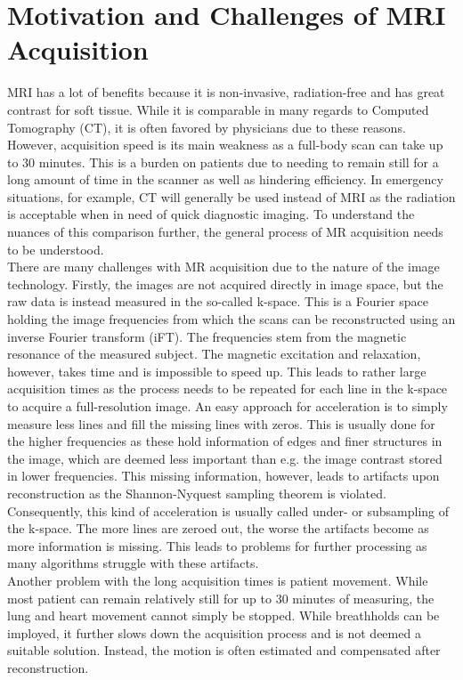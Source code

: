 \section{Motivation and Challenges of MRI Acquisition} \label{Sec:MotivationChallengesMRIAcquisition}
MRI has a lot of benefits because it is non-invasive, radiation-free and has great contrast for soft tissue. While it is comparable in many regards to Computed Tomography (CT), it is often favored by physicians due to these reasons. However, acquisition speed is its main weakness as a full-body scan can take up to 30 minutes. This is a burden on patients due to needing to remain still for a long amount of time in the scanner as well as hindering efficiency. In emergency situations, for example, CT will generally be used instead of MRI as the radiation is acceptable when in need of quick diagnostic imaging. To understand the nuances of this comparison further, the general process of MR acquisition needs to be understood.\\
There are many challenges with MR acquisition due to the nature of the image technology. Firstly, the images are not acquired directly in image space, but the raw data is instead measured in the so-called k-space. This is a Fourier space holding the image frequencies from which the scans can be reconstructed using an inverse Fourier transform (iFT). The frequencies stem from the magnetic resonance of the measured subject. The magnetic excitation and relaxation, however, takes time and is impossible to speed up. This leads to rather large acquisition times as the process needs to be repeated for each line in the k-space to acquire a full-resolution image. An easy approach for acceleration is to simply measure less lines and fill the missing lines with zeros. This is usually done for the higher frequencies as these hold information of edges and finer structures in the image, which are deemed less important than e.g. the image contrast stored in lower frequencies. This missing information, however, leads to artifacts upon reconstruction as the Shannon-Nyquest sampling theorem is violated. Consequently, this kind of acceleration is usually called under- or subsampling of the k-space. The more lines are zeroed out, the worse the artifacts become as more information is missing. This leads to problems for further processing as many algorithms struggle with these artifacts. \\
Another problem with the long acquisition times is patient movement. While most patient can remain relatively still for up to 30 minutes of measuring, the lung and heart movement cannot simply be stopped. While breathholds can be imployed, it further slows down the acquisition process and is not deemed a suitable solution. Instead, the motion is often estimated and compensated after reconstruction.

